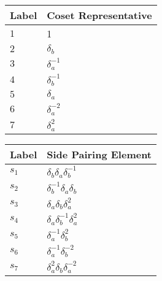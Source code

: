 \documentclass{article}
\begin{document}

\begin{center}
\begin{tabular}{ll}
\toprule
Label & Coset Representative\\
\midrule
$1$ & 1 \\
$2$ & $\delta_b^{}$ \\
$3$ & $\delta_a^{-1}$ \\
$4$ & $\delta_b^{-1}$ \\
$5$ & $\delta_a^{}$ \\
$6$ & $\delta_a^{-2}$ \\
$7$ & $\delta_a^{2}$ \\
\bottomrule
\end{tabular}
\hfill
\begin{tabular}{ll}
\toprule
Label & Side Pairing Element\\
\midrule
$s_{1}$ & $\delta_b^{}\delta_a^{}\delta_b^{-1}$ \\
$s_{2}$ & $\delta_b^{-1}\delta_a^{}\delta_b^{}$ \\
$s_{3}$ & $\delta_a^{}\delta_b^{}\delta_a^{2}$ \\
$s_{4}$ & $\delta_a^{}\delta_b^{-1}\delta_a^{2}$ \\
$s_{5}$ & $\delta_a^{-1}\delta_b^{2}$ \\
$s_{6}$ & $\delta_a^{-1}\delta_b^{-2}$ \\
$s_{7}$ & $\delta_a^{2}\delta_b^{}\delta_a^{-2}$ \\
\bottomrule
\end{tabular}
\end{center}

\thispagestyle{empty}
\end{document}
